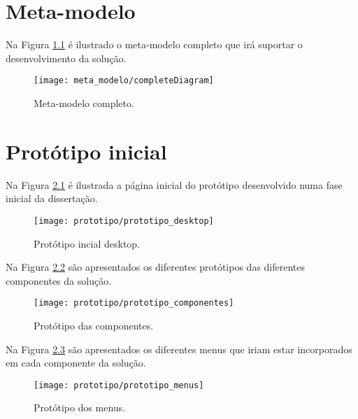 
%

\chapter{Meta-modelo}
\label{app:meta_modelo_app}

Na Figura \ref{fig:meta_modelo_img} é ilustrado o meta-modelo completo que irá suportar o desenvolvimento da solução.

\begin{figure}[htbp]
  \texttt{[image: meta\_modelo/completeDiagram]}
  \centering
  \caption{Meta-modelo completo.}
  \label{fig:meta_modelo_img}
\end{figure}

\chapter{Protótipo inicial}
\label{app:prototipo_inicial}

Na Figura \ref{fig:prototipo_desktop} é ilustrada a página inicial do protótipo desenvolvido numa fase inicial da dissertação.

\begin{figure}[htbp]
  \texttt{[image: prototipo/prototipo\_desktop]}
  \centering
  \caption{Protótipo incial desktop.}
  \label{fig:prototipo_desktop}
\end{figure}

Na Figura \ref{fig:prototipo_componentes} são apresentados os diferentes protótipos das diferentes componentes da solução.

\begin{figure}[htbp]
  \texttt{[image: prototipo/prototipo\_componentes]}
  \centering
  \caption{Protótipo das componentes.}
  \label{fig:prototipo_componentes}
\end{figure}

Na Figura \ref{fig:prototipo_menus} são apresentados os diferentes menus que iriam estar incorporados em cada componente da solução.

\begin{figure}[htbp]
  \texttt{[image: prototipo/prototipo\_menus]}
  \centering
  \caption{Protótipo dos menus.}
  \label{fig:prototipo_menus}
\end{figure}